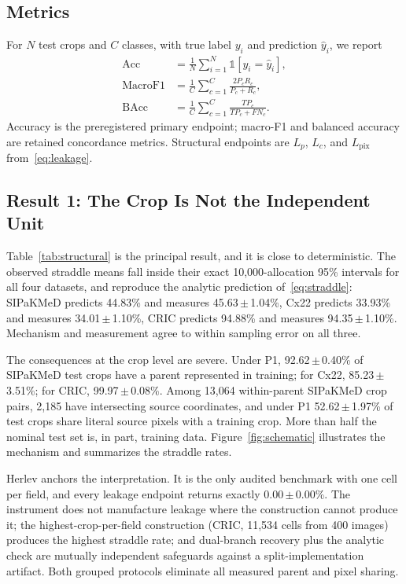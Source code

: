 \documentclass[conference]{IEEEtran}
\newcommand{\meanpm}[2]{#1\,$\pm$\,#2}
\newcommand{\protocol}[1]{\textsf{#1}}
\begin{document}
\subsection{Metrics}
For $N$ test crops and $C$ classes, with true label $y_i$ and prediction $\hat y_i$, we report
\begin{align}
\mathrm{Acc}&=\frac{1}{N}\sum_{i=1}^{N}\mathbb{1}[y_i=\hat y_i],\\
\mathrm{MacroF1}&=\frac{1}{C}\sum_{c=1}^{C}\frac{2P_cR_c}{P_c+R_c},\\
\mathrm{BAcc}&=\frac{1}{C}\sum_{c=1}^{C}\frac{TP_c}{TP_c+FN_c}.
\end{align}
Accuracy is the preregistered primary endpoint; macro-F1 and balanced accuracy are retained concordance metrics.
Structural endpoints are $L_p$, $L_c$, and $L_{\mathrm{pix}}$ from~\eqref{eq:leakage}.

\subsection{Result 1: The Crop Is Not the Independent Unit}
Table~\ref{tab:structural} is the principal result, and it is close to deterministic.
The observed straddle means fall inside their exact 10,000-allocation 95\% intervals for all four datasets, and reproduce the analytic prediction of~\eqref{eq:straddle}: SIPaKMeD predicts 44.83\% and measures \meanpm{45.63}{1.04}\%, Cx22 predicts 33.93\% and measures \meanpm{34.01}{1.10}\%, CRIC predicts 94.88\% and measures \meanpm{94.35}{1.10}\%.
Mechanism and measurement agree to within sampling error on all three.

The consequences at the crop level are severe.
Under \protocol{P1}, \meanpm{92.62}{0.40}\% of SIPaKMeD test crops have a parent represented in training; for Cx22, \meanpm{85.23}{3.51}\%; for CRIC, \meanpm{99.97}{0.08}\%.
Among 13,064 within-parent SIPaKMeD crop pairs, 2,185 have intersecting source coordinates, and under \protocol{P1} \meanpm{52.62}{1.97}\% of test crops share literal source pixels with a training crop.
More than half the nominal test set is, in part, training data.
Figure~\ref{fig:schematic} illustrates the mechanism and summarizes the straddle rates.

Herlev anchors the interpretation.
It is the only audited benchmark with one cell per field, and every leakage endpoint returns exactly \meanpm{0.00}{0.00}\%.
The instrument does not manufacture leakage where the construction cannot produce it; the highest-crop-per-field construction (CRIC, 11,534 cells from 400 images) produces the highest straddle rate; and dual-branch recovery plus the analytic check are mutually independent safeguards against a split-implementation artifact.
Both grouped protocols eliminate all measured parent and pixel sharing.
\end{document}
